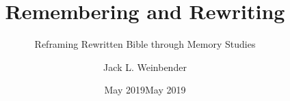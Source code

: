 \documentclass[letterpaper,12pt,oneside]{memoir}
\begin{document}
\author{Jack L. Weinbender}
\date{May 2019}
\title{Remembering and Rewriting}
\subtitle{Reframing Rewritten Bible through Memory Studies}
\date{May 2019}

\frontmatter
% 

\mainmatter


\nocite{*}
\backmatter
\begin{SingleSpace}
  \printbibliography[heading=bibintoc]
\end{SingleSpace}
\end{document}
